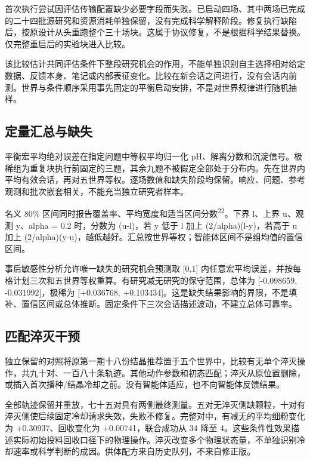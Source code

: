\documentclass[10pt,a4paper]{article}
\begin{document}
首次执行尝试因评估传输配置缺少必要字段而失败。已启动四场、其中两场已完成的二十四批源研究和资源消耗单独保留，没有完成科学解释阶段。修复执行缺陷后，按原设计从头重跑整个三十场块。这属于协议修复，不是根据科学结果替换。仅完整重启后的实验块进入比较。

该比较估计共同评估条件下整段研究机会的作用，不能单独识别自主选择相对给定数据、反馈本身、笔记或内部表征变化。比较在新会话之间进行，没有会话内前测。世界与条件顺序采用事先固定的平衡启动安排，不是对世界规律进行随机抽样。

\subsection{定量汇总与缺失}\label{ux5b9aux91cfux6c47ux603bux4e0eux7f3aux5931}

平衡宏平均绝对误差在指定问题中等权平均归一化 pH、解离分数和沉淀信号。极稀组为重复块执行前固定的三题，其余九题不被假定全部处于分布内。先在世界内平均有效会话，再对五世界等权。逐场数值和缺失阶段均保留。响应、问题、参考观测和批次嵌套相关，不能充当独立研究者样本。

名义 80\% 区间同时报告覆盖率、平均宽度和适当区间分数\textsuperscript{22}。下界 l、上界 u、观测 y、alpha = 0.2 时，分数为 (u-l)，若 y 低于 l 加上 (2/alpha)(l-y)，若高于 u 加上 (2/alpha)(y-u)，越低越好。汇总按世界等权；智能体区间不是组均值的置信区间。

事后敏感性分析允许唯一缺失的研究机会预测取 {[}0,1{]} 内任意宏平均误差，并按每格计划三次和五世界等权重算。有研究减无研究的保守范围，总体为 {[}-0.098659, -0.031992{]}，极稀为 {[}+0.036768, +0.103434{]}。这是缺失结果影响的界限，不是填补、置信区间或总体推断。固定条件下三次会话描述波动，不建立总体可靠率。

\subsection{匹配淬灭干预}\label{ux5339ux914dux6decux706dux5e72ux9884}

独立保留的对照将原第一期十八份结晶推荐置于五个世界中，比较有无单个淬灭操作，共九十对、一百八十条轨迹。其他动作参数和初态匹配；淬灭从原位置删除，或插入首次播种/结晶冷却之前。没有智能体适应，也不向智能体反馈结果。

全部轨迹保留并重放，七十五对具有两侧最终测量。五对无淬灭侧缺颗粒，十对有淬灭侧使后续固定冷却请求失效，失败不修复。完整对中，有减无的平均细粉变化为 +0.30937、回收变化为 +0.00741，联合成功从 34 降至 4。这些条件性效果描述实际初始投料回收口径下的物理操作。淬灭改变多个物理状态量，不单独识别冷却速率或科学判断的成因。供体配方来自历史队列，不来自修正版。
\end{document}

